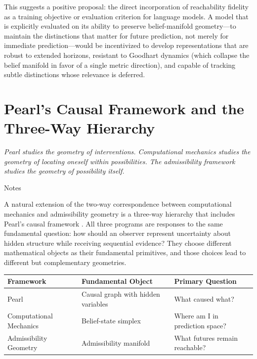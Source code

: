 \documentclass[12pt, a4paper]{article}
\theoremstyle{plain}
\theoremstyle{definition}
\theoremstyle{remark}
\begin{document}
This suggests a positive proposal: the direct incorporation of reachability
fidelity as a training objective or evaluation criterion for language models.
A model that is explicitly evaluated on its ability to preserve belief-manifold
geometry---to maintain the distinctions that matter for future prediction,
not merely for immediate prediction---would be incentivized to develop
representations that are robust to extended horizons, resistant to
Goodhart dynamics (which collapse the belief manifold in favor of a single
metric direction), and capable of tracking subtle distinctions whose
relevance is deferred.

\section{Pearl's Causal Framework and the Three-Way Hierarchy}
\label{sec:pearl}

\epigraph{\textit{Pearl studies the geometry of interventions.
Computational mechanics studies the geometry of locating oneself within
possibilities. The admissibility framework studies the geometry of
possibility itself.}}{Notes}

\noindent
A natural extension of the two-way correspondence between computational
mechanics and admissibility geometry is a three-way hierarchy that includes
Pearl's causal framework \citep{pearl2000,pearl2009}. All three programs
are responses to the same fundamental question: how should an observer
represent uncertainty about hidden structure while receiving sequential
evidence? They choose different mathematical objects as their fundamental
primitives, and those choices lead to different but complementary geometries.

\begin{center}
\begin{tabular}{lll}
\toprule
\textbf{Framework} & \textbf{Fundamental Object} & \textbf{Primary Question} \\
\midrule
Pearl & Causal graph with hidden variables & What caused what? \\
Computational Mechanics & Belief-state simplex & Where am I in prediction space? \\
Admissibility Geometry & Admissibility manifold & What futures remain reachable? \\
\bottomrule
\end{tabular}
\end{center}
\end{document}
